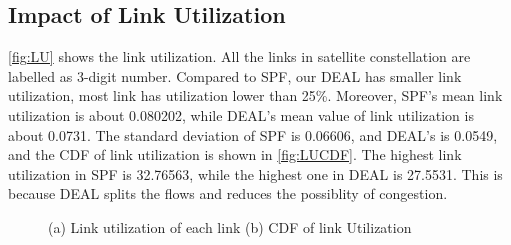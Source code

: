 \subsection{Impact of Link Utilization}
\ref{fig:LU} shows the link utilization. All the links in satellite constellation are labelled as 3-digit number. Compared to SPF, our DEAL has smaller link utilization, most link has utilization lower than 25\%. Moreover, SPF's mean link utilization is about 0.080202, while DEAL's mean value of link utilization is about 0.0731. The standard deviation of SPF is 0.06606, and DEAL's is 0.0549, and the CDF of link utilization is shown in \ref{fig:LUCDF}. The highest link utilization in SPF is 32.76563, while the highest one in DEAL is 27.5531. This is because DEAL splits the flows and reduces the possiblity of congestion.

\begin{figure}[htp]
	
\caption{(a) Link utilization of each link (b) CDF of link Utilization}
\label{fig:UTILIZATION}
\end{figure}


